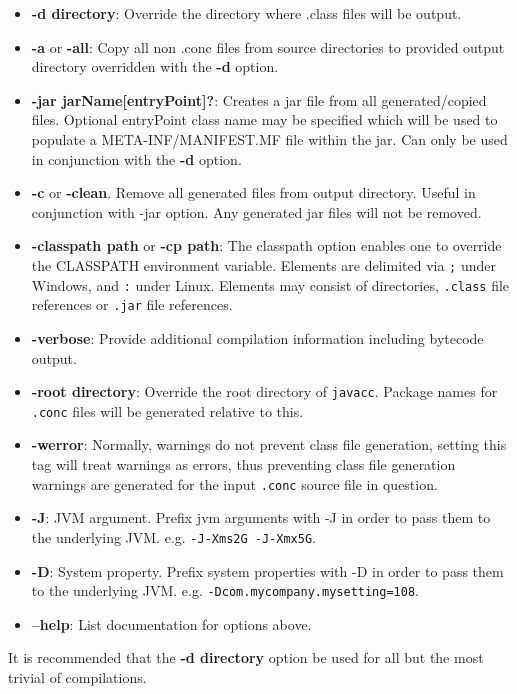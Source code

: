 \documentclass[conc-doc]{subfiles}
\begin{document}
\begin{itemize}
	\item \textbf{-d directory}: Override the directory where .class files will be output.
	\item \textbf{-a} or \textbf{-all}: Copy all non .conc files from source directories to provided output directory overridden with the \textbf{-d} option.
	\item \textbf{-jar jarName[entryPoint]?}: Creates a jar file from all generated/copied files. Optional entryPoint class name may be specified which will be used to populate a META-INF/MANIFEST.MF file within the jar. Can only be used in conjunction with the \textbf{-d} option.
	\item \textbf{-c} or \textbf{-clean}. Remove all generated files from output directory. Useful in conjunction with -jar option. Any generated jar files will not be removed.	
	\item \textbf{-classpath path} or \textbf{-cp path}: The classpath option enables one to override the CLASSPATH environment variable. Elements are delimited via \lstinline{;} under Windows, and \lstinline{:} under Linux. Elements may consist of directories, \lstinline{.class} file references or \lstinline{.jar} file references.
	\item \textbf{-verbose}: Provide additional compilation information including bytecode output.
	\item \textbf{-root directory}: Override the root directory of \lstinline{javacc}. Package names for \lstinline{.conc} files will be generated relative to this.
	\item \textbf{-werror}: Normally, warnings do not prevent class file generation, setting this tag will treat warnings as errors, thus preventing class file generation warnings are generated for the input \lstinline{.conc} source file in question.
	\item \textbf{-J}: JVM argument. Prefix jvm arguments with -J in order to pass them to the underlying JVM. e.g. \lstinline{-J-Xms2G -J-Xmx5G}.
	\item \textbf{-D}: System property. Prefix system properties with -D in order to pass them to the underlying JVM. e.g. \lstinline{-Dcom.mycompany.mysetting=108}.
	\item \textbf{--help}: List documentation for options above.
\end{itemize}

It is recommended that the \textbf{-d directory} option be used for all but the most trivial of compilations.
\end{document}
